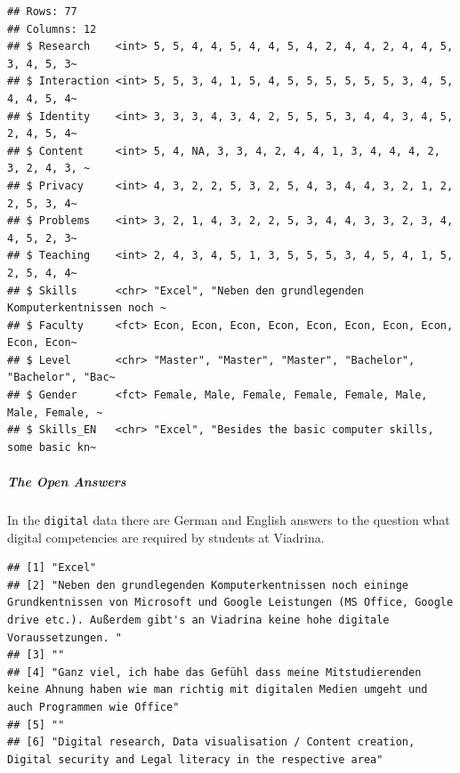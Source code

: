 \documentclass[
]{book}
\newenvironment{Shaded}{\begin{snugshade}}{\end{snugshade}}
\newcommand{\FunctionTok}[1]{\textcolor[rgb]{0.00,0.00,0.00}{#1}}
\newcommand{\NormalTok}[1]{#1}
\newcommand{\SpecialCharTok}[1]{\textcolor[rgb]{0.00,0.00,0.00}{#1}}
\begin{document}
\begin{verbatim}
## Rows: 77
## Columns: 12
## $ Research    <int> 5, 5, 4, 4, 5, 4, 4, 5, 4, 2, 4, 4, 2, 4, 4, 5, 3, 4, 5, 3~
## $ Interaction <int> 5, 5, 3, 4, 1, 5, 4, 5, 5, 5, 5, 5, 5, 3, 4, 5, 4, 4, 5, 4~
## $ Identity    <int> 3, 3, 3, 4, 3, 4, 2, 5, 5, 5, 3, 4, 4, 3, 4, 5, 2, 4, 5, 4~
## $ Content     <int> 5, 4, NA, 3, 3, 4, 2, 4, 4, 1, 3, 4, 4, 4, 2, 3, 2, 4, 3, ~
## $ Privacy     <int> 4, 3, 2, 2, 5, 3, 2, 5, 4, 3, 4, 4, 3, 2, 1, 2, 2, 5, 3, 4~
## $ Problems    <int> 3, 2, 1, 4, 3, 2, 2, 5, 3, 4, 4, 3, 3, 2, 3, 4, 4, 5, 2, 3~
## $ Teaching    <int> 2, 4, 3, 4, 5, 1, 3, 5, 5, 5, 3, 4, 5, 4, 1, 5, 2, 5, 4, 4~
## $ Skills      <chr> "Excel", "Neben den grundlegenden Komputerkentnissen noch ~
## $ Faculty     <fct> Econ, Econ, Econ, Econ, Econ, Econ, Econ, Econ, Econ, Econ~
## $ Level       <chr> "Master", "Master", "Master", "Bachelor", "Bachelor", "Bac~
## $ Gender      <fct> Female, Male, Female, Female, Female, Male, Male, Female, ~
## $ Skills_EN   <chr> "Excel", "Besides the basic computer skills, some basic kn~
\end{verbatim}

\hypertarget{the-open-answers}{%
\subparagraph{The Open Answers}\label{the-open-answers}}

In the \texttt{digital} data there are German and English answers to the question what digital competencies are required by students at Viadrina.

\begin{Shaded}
\end{Shaded}

\begin{verbatim}
## [1] "Excel"                                                                                                                                                                                                        
## [2] "Neben den grundlegenden Komputerkentnissen noch eininge Grundkentnissen von Microsoft und Google Leistungen (MS Office, Google drive etc.). Außerdem gibt's an Viadrina keine hohe digitale Voraussetzungen. "
## [3] ""                                                                                                                                                                                                             
## [4] "Ganz viel, ich habe das Gefühl dass meine Mitstudierenden keine Ahnung haben wie man richtig mit digitalen Medien umgeht und auch Programmen wie Office"                                                      
## [5] ""                                                                                                                                                                                                             
## [6] "Digital research, Data visualisation / Content creation, Digital security and Legal literacy in the respective area"
\end{verbatim}
\end{document}
